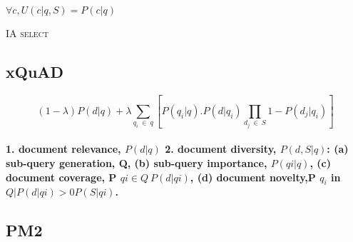\begin{algorithm}[t]
  \small


  \ShowLn$\forall c, U(c|q, S) = P(c|q)$

  \ShowLn{}

  \ShowLn{}

  \BlankLine

  \caption{\textsc{IA select}}
  \vspace{-2mm}
  \label{alg:ATD}
\end{algorithm}


\vspace{10 mm}

\subsection{xQuAD}

\begin{equation}
(1-\lambda) P(d|q) + \lambda\sum_{q_{i} \: \in \: q} \left [ P(q_{i}|q).P(d|q_{i})\prod_{d_{j} \: \in \: S} 1- P(d_{j}|q_{i}) \right ]
\end{equation}

\vspace{10 mm}
\paragraph{
	1. document relevance, $P(d|q)$
	2. document diversity, $P(d, S|q)$:
	(a) sub-query generation, Q,
	(b) sub-query importance, $P(qi|q)$,
	(c) document coverage, P
	$qi∈Q\: P(d|qi)$,
	(d) document novelty,P
	 $q_i$ in $Q| P(d|qi)>0 P(S|qi)$.
}


\vspace{10 mm}

\subsection{PM2}

